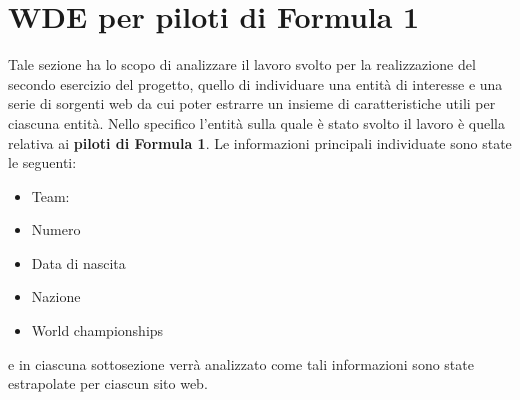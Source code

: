 \documentclass[12pt, letterpaper]{article}
\begin{document}
\section{WDE per piloti di Formula 1}\label{sezione2}
Tale sezione ha lo scopo di analizzare il lavoro svolto per la realizzazione del secondo esercizio del progetto, quello di individuare una entità di interesse e una serie di sorgenti web da cui poter estrarre un insieme di caratteristiche utili per ciascuna entità. Nello specifico l'entità sulla quale è stato svolto il lavoro è quella relativa ai \textbf{piloti di Formula 1}. Le informazioni principali individuate sono state le seguenti:
\begin{itemize}
    \item Team:
    \item Numero
    \item Data di nascita
    \item Nazione
    \item World championships
\end{itemize}
e in ciascuna sottosezione verrà analizzato come tali informazioni sono state estrapolate per ciascun sito web.
\end{document}

